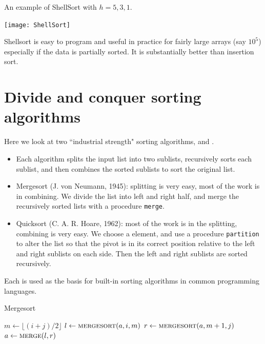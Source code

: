 \begin{Boxample}
An example of ShellSort with $h = 5, 3, 1$.
\begin{center}
\texttt{[image: ShellSort]} 
\end{center}
\end{Boxample}

Shellsort is easy to program and useful in practice for fairly large arrays (say $10^5$) especially if the data is partially sorted. 
It is substantially  better than insertion sort.

\chapter{Divide and conquer sorting algorithms}  %
\label{sec:mergesort}
Here we look at two ``industrial strength" sorting algorithms,  and .
\begin{itemize}
\item Each algorithm splits the input list into two sublists, 
recursively sorts each sublist, and then combines the sorted sublists to sort 
the original list.
\item Mergesort (J. von Neumann, 1945): splitting is very easy, most 
of the work is in combining. 
We divide the list into left and right half, and merge the recursively sorted 
lists with a procedure \texttt{merge}. 
\item Quicksort (C. A. R. Hoare, 1962): most of the work is in the 
splitting, combining is very easy. We choose a  element, and use a 
procedure \texttt{partition} to alter the list so that the pivot is in its 
correct position relative to the left and right sublists on each side. Then the left and right sublists 
are sorted recursively.
\end{itemize}
Each is used as the basis for 
built-in sorting algorithms in common programming languages.

\begin{algorithm}[H]
  \caption{Mergesort
    \label{alg:mergesort}}
\begin{algorithmic}[0]
\State $m \gets \lfloor (i + j)/2 \rfloor$ 
\State $l \gets \Call{mergesort}{a,i,m}$ 
\State $r \gets  \Call{mergesort}{a,m+1,j}$ 
\State $a \gets  \Call{merge}{l, r}$ 
\EndIf
\State {}
\EndFunction  
\end{algorithmic}
\end{algorithm}

